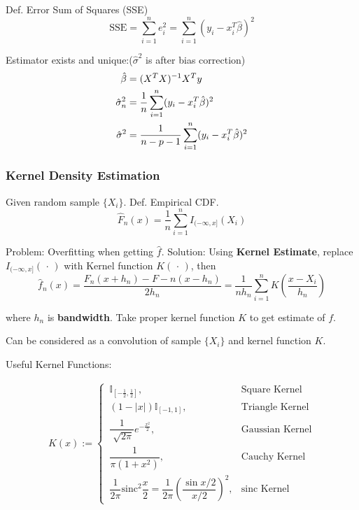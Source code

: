     Def. Error Sum of Squares (SSE)
    \begin{equation}\mathrm{SSE}=\sum_{i=1}^ne_i^2=\sum_{i=1}^n(y_i-x_i^T\hat{\beta })^2\end{equation}

    Estimator exists and unique:($\hat{\sigma}^2$ is after bias correction)
    \begin{align}
        \hat{\beta}&=(X^TX)^{-1}X^Ty\notag \\
        \hat{\sigma}_n^2&=\frac{1}{n}\sum_{i=1}^n(y_i-x^T_i\hat{\beta})^2 \notag\\ 
        \hat{\sigma}^2&=\frac{1}{n-p-1}\sum_{i=1}^n(y_i-x_i^T\hat{\beta})^2\label{EqaEstimatorSigmaWithDoF}
    \end{align}

    

\subsubsection{Kernel Density Estimation}\label{SubSectionKernelDensityEstimation}
    Given random sample $\{X_i\}$. Def. Empirical CDF.
    \begin{equation}\label{empiricaldisreibutionfunction}
        \hat{F}_n(x)=\frac{1}{n}\sum_{i=1}^nI_{(-\infty,x]}(X_i) 
    \end{equation}
        

    Problem: Overfitting when getting $\hat{f}$. Solution: Using \textbf{Kernel Estimate}, replace $I_{(-\infty,x]}(\,\cdot\,)$ with Kernel function $K(\,\cdot\,)$, then
    \begin{equation}
        \hat{f}_n(x)=\dfrac{F_n(x+h_n)-F-n(x-h_n)}{2h_n}=\frac{1}{nh_n}\sum_{i=1}^nK(\frac{x-X_i}{h_n})
    \end{equation}

    where $h_n$ is \textbf{bandwidth}. Take proper kernel function $K$ to get estimate of $f$.

    Can be considered as a convolution of sample $\{X_i\}$ and kernel function $K$.

    Useful Kernel Functions:
    
    \begin{align*}
        K(x):=\begin{cases}
            \,\mathbb{I}_{[-\frac{1}{2},\frac{1}{2}]},&\text{Square Kernel}\\
            \,(1-|x|)\mathbb{I}_{[-1,1]},&\text{Triangle Kernel}\\
            \,\dfrac{1}{\sqrt[]{2\pi}}e^{-\frac{x^2}{2}},&\text{Gaussian Kernel}\\
            \,\dfrac{1}{\pi(1+x^2)},&\text{Cauchy Kernel}\\
            \,\dfrac{1}{2\pi}\mathrm{sinc}^2\dfrac{x}{2}=\dfrac{1}{2\pi}\left(\dfrac{\sin x/2}{x/2}\right)^2,&\text{sinc Kernel}
        \end{cases} 
    \end{align*}
    








